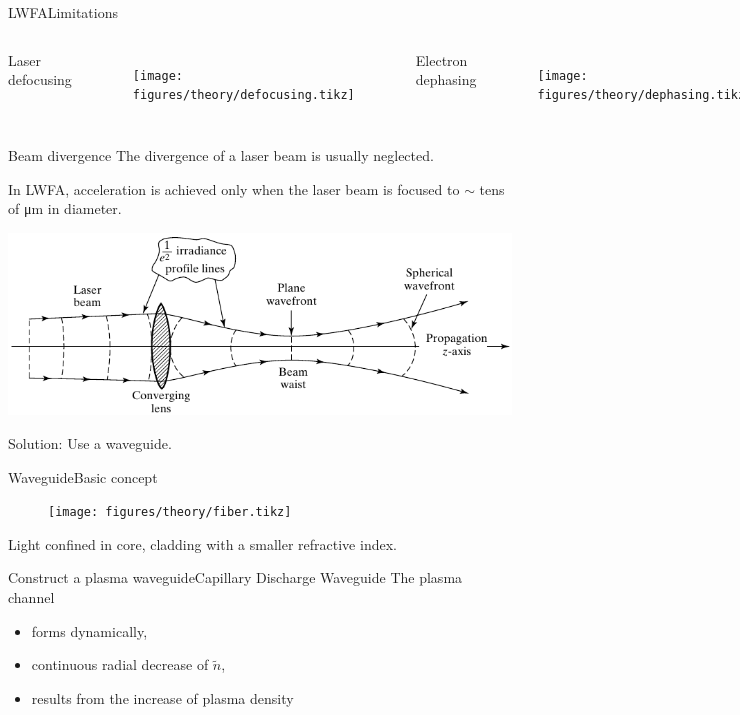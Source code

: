 \documentclass[dvipsnames]{beamer}
\begin{document}
\begin{frame}{LWFA}{Limitations}
\begin{columns}  
   Laser defocusing
\begin{figure}
\texttt{[image: figures/theory/defocusing.tikz]}
\end{figure}
     Electron dephasing
\begin{figure}
\texttt{[image: figures/theory/dephasing.tikz]}
   \end{figure}
   \end{columns}
\end{frame}
 \begin{frame}{Beam divergence}
   The divergence of a laser beam is usually neglected.

   In LWFA, acceleration is achieved only when the laser beam is focused to $\sim$ tens of \si{\um} in diameter.
   \begin{center}
     \includegraphics[width=\textwidth]{figures/theory/laser_lens_rayleigh.pdf}
   \end{center}
   Solution: Use a waveguide.
 \end{frame}
 \begin{frame}{Waveguide}{Basic concept}
 \begin{figure}
    \texttt{[image: figures/theory/fiber.tikz]}
  \end{figure}
  Light confined in core, cladding with a smaller refractive index.
 \end{frame}
 \begin{frame}{Construct a plasma waveguide}{Capillary Discharge Waveguide}
   The plasma channel
   \begin{itemize}
     \item[\textbullet] forms dynamically,
     \item[\textbullet] continuous radial decrease of $\tilde n$,
     \item[\textbullet] results from the increase of plasma density
   \end{itemize}
 \end{frame}
\end{document}
